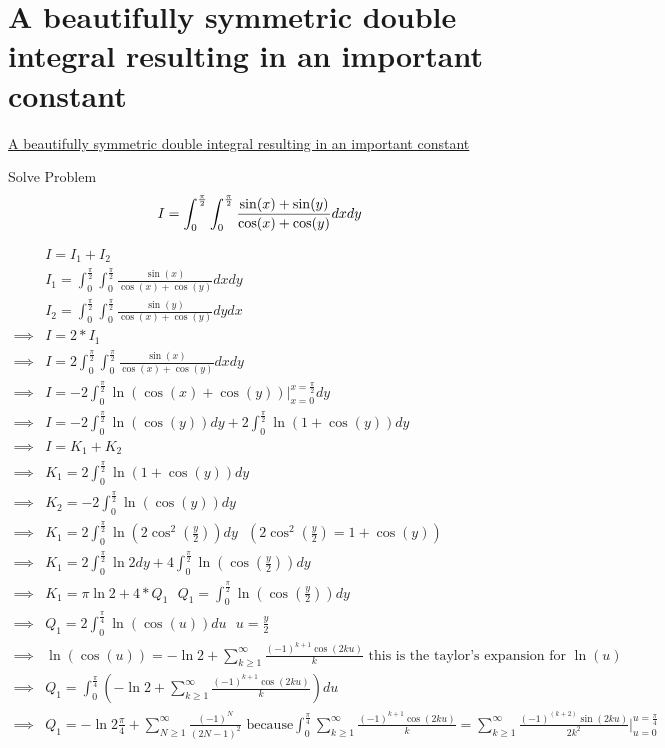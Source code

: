 \documentclass {article}
\begin{document}
\section{A beautifully symmetric double integral resulting in an important constant}
\href{https://www.youtube.com/watch?v=MVgDeJaLcd0}{A beautifully symmetric double integral resulting in an important constant}

Solve Problem \\
\[
    I = \displaystyle\int_0^{\frac{\pi}{2}}\int_0^{\frac{\pi}{2}} \frac{\sin(x) + \sin(y)}{\cos(x) + \cos(y)} {d}x{d}y \\
\]

\[
\begin{matrix}
    & I = I_1 + I_2 \\
    & I_1 = \int_0^{\frac{\pi}{2}}\int_0^{\frac{\pi}{2}} \frac{\sin(x)}{\cos(x)+ \cos(y)}{d}x{d}y \\
    & I_2 = \int_0^{\frac{\pi}{2}}\int_0^{\frac{\pi}{2}} \frac{\sin(y)}{\cos(x)+ \cos(y)}{d}y{d}x \\
\implies & I = 2 * I_1 \\
\implies & I = 2 \int_0^{\frac{\pi}{2}}\int_0^{\frac{\pi}{2}} \frac{\sin(x)}{\cos(x)+ \cos(y)}{d}x{d}y \\
\implies & I = -2 \int_0^{\frac{\pi}{2}} \ln\left(\cos(x) + \cos(y)\right)\Big|_{x=0}^{x=\frac{\pi}{2}}{d}y \\
\implies & I = -2 \int_0^{\frac{\pi}{2}} \ln\left(\cos(y)\right){d}y + 2 \int_0^{\frac{\pi}{2}}\ln\left(1 + \cos(y)\right){d}y \\
\implies & I = K_1 + K_2 \\
\implies & K_1 = 2 \int_0^{\frac{\pi}{2}}\ln\left(1 + \cos(y)\right){d}y \\
\implies & K_2 = -2 \int_0^{\frac{\pi}{2}} \ln\left(\cos(y)\right){d}y \\
\implies & K_1 = 2 \int_0^{\frac{\pi}{2}}\ln\left(2 \cos^2(\frac{y}{2})\right){d}y \text{   } \left( 2\cos^2(\frac{y}{2}) = 1 + \cos(y) \right) \\
\implies & K_1 = 2 \int_0^{\frac{\pi}{2}} \ln2{d}y + 4 \int_0^{\frac{\pi}{2}}\ln\left(\cos(\frac{y}{2})\right){d}y \\
\implies & K_1 = \pi\ln2  + 4 * Q_1 \text{   } Q_1 = \int_0^{\frac{\pi}{2}}\ln\left(\cos(\frac{y}{2})\right){d}y \\
\implies & Q_1 = 2\int_0^{\frac{\pi}{4}}\ln\left(\cos(u)\right){d}u  \text{      } u = \frac{y}{2} \\
\implies & \ln\left(\cos(u)\right) = -\ln2 + \displaystyle\sum_{k \ge 1}^{\infty} \frac{(-1)^{k+1}\cos(2ku)}{k} \text{ this is the taylor's expansion for }\ln(u) \\
\implies & Q_1 = \int_0^{\frac{\pi}{4}}\left(-\ln2 + \displaystyle\sum_{k \ge 1}^{\infty} \frac{(-1)^{k+1}\cos(2ku)}{k}\right){d}u \\
\implies & Q_1 = -\ln2 \frac{\pi}{4} + \displaystyle\sum_{N \ge 1}^{\infty}  \frac{(-1)^N}{(2N-1)^2} \text{ because}   \int_0^{\frac{\pi}{4}}\displaystyle\sum_{k \ge 1}^{\infty}\frac{(-1)^{k+1}\cos(2ku)}{k} = \displaystyle\sum_{k \ge 1}^{\infty}\frac{(-1)^{(k+2)}\sin(2ku)}{2k^2}\Big|_{u=0}^{u=\frac{\pi}{4}} \\
\end{matrix}
\]
\end{document}
